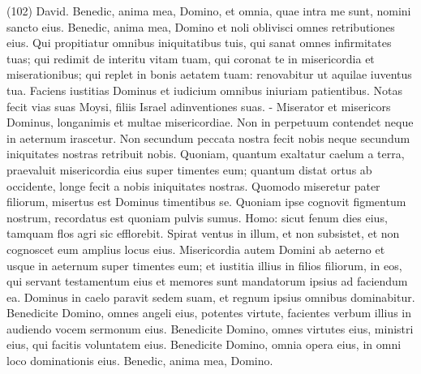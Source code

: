 \begin{biblechapter}  (102) 
\verse David. Benedic, anima mea, Domino, et omnia, quae intra me sunt, nomini sancto eius. 
\verse Benedic, anima mea, Domino et noli oblivisci omnes retributiones eius. 
\verse Qui propitiatur omnibus iniquitatibus tuis, qui sanat omnes infirmitates tuas; 
\verse qui redimit de interitu vitam tuam, qui coronat te in misericordia et miserationibus; 
\verse qui replet in bonis aetatem tuam: renovabitur ut aquilae iuventus tua. 
\verse Faciens iustitias Dominus et iudicium omnibus iniuriam patientibus. 
\verse Notas fecit vias suas Moysi, filiis Israel adinventiones suas. - 
\verse Miserator et misericors Dominus, longanimis et multae misericordiae. 
\verse Non in perpetuum contendet neque in aeternum irascetur. 
\verse Non secundum peccata nostra fecit nobis neque secundum iniquitates nostras retribuit nobis. 
\verse Quoniam, quantum exaltatur caelum a terra, praevaluit misericordia eius super timentes eum; 
\verse quantum distat ortus ab occidente, longe fecit a nobis iniquitates nostras. 
\verse Quomodo miseretur pater filiorum, misertus est Dominus timentibus se. 
\verse Quoniam ipse cognovit figmentum nostrum, recordatus est quoniam pulvis sumus. 
\verse Homo: sicut fenum dies eius, tamquam flos agri sic efflorebit. 
\verse Spirat ventus in illum, et non subsistet, et non cognoscet eum amplius locus eius. 
\verse Misericordia autem Domini ab aeterno et usque in aeternum super timentes eum; et iustitia illius in filios filiorum, 
\verse in eos, qui servant testamentum eius et memores sunt mandatorum ipsius ad faciendum ea. 
\verse Dominus in caelo paravit sedem suam, et regnum ipsius omnibus dominabitur. 
\verse Benedicite Domino, omnes angeli eius, potentes virtute, facientes verbum illius in audiendo vocem sermonum eius. 
\verse Benedicite Domino, omnes virtutes eius, ministri eius, qui facitis voluntatem eius. 
\verse Benedicite Domino, omnia opera eius, in omni loco dominationis eius. Benedic, anima mea, Domino. 
\end{biblechapter}

